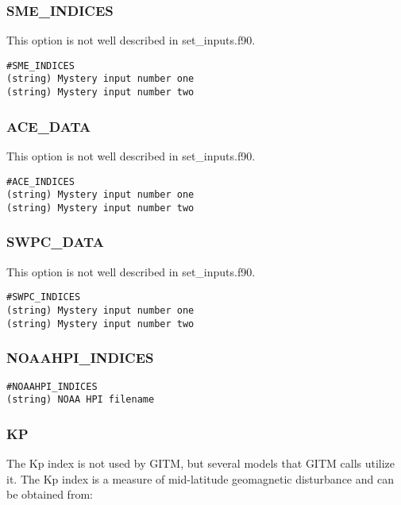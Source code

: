 \subsubsection{SME\_INDICES}
\label{sme_indices.sec}

This option is not well described in set\_inputs.f90.

\begin{verbatim}
#SME_INDICES
(string) Mystery input number one
(string) Mystery input number two
\end{verbatim}

\subsubsection{ACE\_DATA}
\label{ace_data.sec}

This option is not well described in set\_inputs.f90.

\begin{verbatim}
#ACE_INDICES
(string) Mystery input number one
(string) Mystery input number two
\end{verbatim}

\subsubsection{SWPC\_DATA}
\label{swpc_data.sec}

This option is not well described in set\_inputs.f90.

\begin{verbatim}
#SWPC_INDICES
(string) Mystery input number one
(string) Mystery input number two
\end{verbatim}

\subsubsection{NOAAHPI\_INDICES}
\label{noaahpi_indices.sec}

\begin{verbatim}
#NOAAHPI_INDICES
(string) NOAA HPI filename
\end{verbatim}

\subsubsection{KP}
\label{kp.sec}

The Kp index is not used by GITM, but several models that GITM calls utilize it.  The Kp index is a measure of mid-latitude geomagnetic disturbance and can be obtained from:

